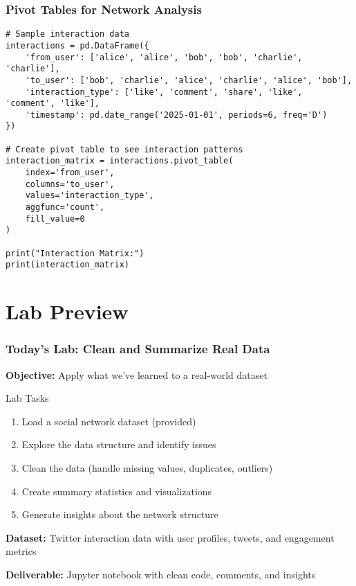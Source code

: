 \documentclass[aspectratio=169]{beamer}
\begin{document}
\begin{frame}[fragile]
\frametitle{Pivot Tables for Network Analysis}
\begin{lstlisting}[caption=Creating Pivot Tables]
# Sample interaction data
interactions = pd.DataFrame({
    'from_user': ['alice', 'alice', 'bob', 'bob', 'charlie', 'charlie'],
    'to_user': ['bob', 'charlie', 'alice', 'charlie', 'alice', 'bob'],
    'interaction_type': ['like', 'comment', 'share', 'like', 'comment', 'like'],
    'timestamp': pd.date_range('2025-01-01', periods=6, freq='D')
})

# Create pivot table to see interaction patterns
interaction_matrix = interactions.pivot_table(
    index='from_user',
    columns='to_user',
    values='interaction_type',
    aggfunc='count',
    fill_value=0
)

print("Interaction Matrix:")
print(interaction_matrix)
\end{lstlisting}
\end{frame}

\section{Lab Preview}

\begin{frame}
\frametitle{Today's Lab: Clean and Summarize Real Data}
\textbf{Objective:} Apply what we've learned to a real-world dataset

\begin{block}{Lab Tasks}
\begin{enumerate}
    \item Load a social network dataset (provided)
    \item Explore the data structure and identify issues
    \item Clean the data (handle missing values, duplicates, outliers)
    \item Create summary statistics and visualizations
    \item Generate insights about the network structure
\end{enumerate}
\end{block}

\textbf{Dataset:} Twitter interaction data with user profiles, tweets, and engagement metrics

\textbf{Deliverable:} Jupyter notebook with clean code, comments, and insights
\end{frame}
\end{document}
